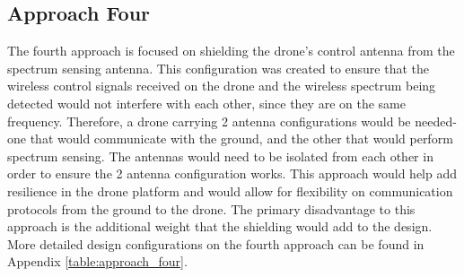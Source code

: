 \subsection{Approach Four}
The fourth approach is focused on shielding the drone’s control antenna from the spectrum sensing antenna. This configuration was created to ensure that the wireless control signals received on the drone and the wireless spectrum being detected would not interfere with each other, since they are on the same frequency. Therefore, a drone carrying 2 antenna configurations would be needed- one that would communicate with the ground, and the other that would perform spectrum sensing. The antennas would need to be isolated from each other in order to ensure the 2 antenna configuration works. This approach would help add resilience in the drone platform and would allow for flexibility on communication protocols from the ground to the drone. The primary disadvantage to this approach is the additional weight that the shielding would add to the design. More detailed design configurations on the fourth approach can be found in Appendix \ref{table:approach_four}.

